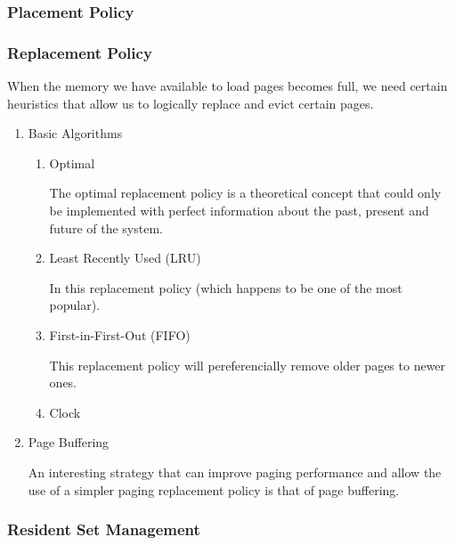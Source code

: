 \documentclass[11pt]{article}
\begin{document}
\subsubsection{Placement Policy}
\label{sec-2-2-2}



\subsubsection{Replacement Policy}
\label{sec-2-2-3}

When the memory we have available to load pages becomes full,
we need certain heuristics that allow us to logically replace
and evict certain pages.

\begin{enumerate}
\item Basic Algorithms
\label{sec-2-2-3-1}

\begin{enumerate}
\item Optimal
\label{sec-2-2-3-1-1}

The optimal replacement policy is a theoretical concept
that could only be implemented with perfect information
about the past, present and future of the system.

\item Least Recently Used (LRU)
\label{sec-2-2-3-1-2}

In this replacement policy (which happens to be one of the
most popular).

\item First-in-First-Out (FIFO)
\label{sec-2-2-3-1-3}

This replacement policy will pereferencially remove older
pages to newer ones.

\item Clock
\label{sec-2-2-3-1-4}
\end{enumerate}



\item Page Buffering
\label{sec-2-2-3-2}

An interesting strategy that can improve paging performance
and allow the use of a simpler paging replacement policy is
that of page buffering.
\end{enumerate}

\subsubsection{Resident Set Management}
\label{sec-2-2-4}
\end{document}
